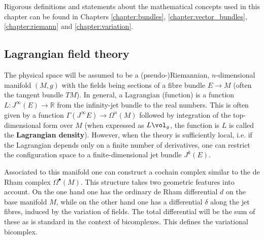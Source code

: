 \chapter{}\label{chapter:classical_fields}

    Rigorous definitions and statements about the mathematical concepts used in this chapter can be found in Chapters \ref{chapter:bundles}, \ref{chapter:vector_bundles}, \ref{chapter:riemann} and \ref{chapter:variation}.

\section{Lagrangian field theory}

    The physical space will be assumed to be a (pseudo-)Riemannian, $n$-dimensional manifold $(M,g)$ with the fields being sections of a fibre bundle $E\rightarrow M$ (often the tangent bundle $TM$). In general, a Lagrangian (function) is a function $L:J^\infty(E)\rightarrow\mathbb{R}$ from the infinity-jet bundle to the real numbers. This is often given by a function $\Gamma(J^\infty E)\rightarrow\Omega^n(M)$ followed by integration of the top-dimensional form over $M$ (when expressed as $L\vol_g$, the function is $L$ is called the \textbf{Lagrangian density}). However, when the theory is sufficiently local, i.e. if the Lagrangian depends only on a finite number of derivatives, one can restrict the configuration space to a finite-dimensional jet bundle $J^k(E)$.

    Associated to this manifold one can construct a cochain complex similar to the de Rham complex $\Omega^\bullet(M)$. This structure takes two geometric features into account. On the one hand one has the ordinary de Rham differential $d$ on the base manifold $M$, while on the other hand one has a differential $\delta$ along the jet fibres, induced by the variation of fields. The total differential will be the sum of these as is standard in the context of bicomplexes. This defines the variational bicomplex.

